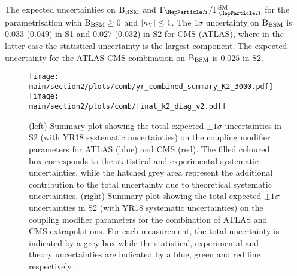The expected uncertainties on $\mathrm{B_{BSM}}$ and $\GammaSM$ for the parametrisation with $\mathrm{B_{BSM}}\geq0$ and $|\kappa_{\mathrm{V}}|\leq1$. The $1\sigma$ uncertainty on $\mathrm{B_{BSM}}$ is $0.033$ ($0.049$) in S1 and $0.027$ ($0.032$) in S2 for CMS (ATLAS), where in the latter case the statistical uncertainty is the largest component.
The expected uncertainty for the ATLAS-CMS combination on  $\mathrm{B_{BSM}}$ is $0.025$ in S2. 

\begin{figure}[hbtp]
\centering
\texttt{[image: \\main/section2/plots/comb/yr\_combined\_summary\_K2\_3000.pdf]}%
\texttt{[image: \\main/section2/plots/comb/final\_k2\_diag\_v2.pdf]}%
\caption{(left) Summary plot showing the total expected $\pm 1\sigma$ uncertainties in S2 (with YR18 systematic uncertainties) on the coupling modifier parameters   for ATLAS (blue)  and CMS (red). The filled coloured box corresponds to the statistical and experimental systematic uncertainties, while the hatched grey area represent the additional contribution to the total uncertainty due to theoretical systematic uncertainties.
(right) Summary plot showing the total expected $\pm 1\sigma$  uncertainties in S2 (with YR18 systematic uncertainties) on the coupling modifier parameters for the combination of ATLAS and CMS extrapolations. For each measurement,  the total uncertainty is indicated by a grey box while the statistical, experimental and theory uncertainties are indicated by a blue, green and red line respectively.}
\label{fig:summary_K2}
\end{figure}


\begin{table}[hbtp]
\centering
\caption{The expected $\pm 1\sigma$ uncertainties, expressed as percentages, on the coupling modifier parameters.%
Values are given for both S1 (with Run~2 systematic uncertainties~\cite{Sirunyan:2018koj}) and S2 (with YR18 systematic uncertainties). The total uncertainty is decomposed into four components: statistical (Stat), signal theory (SigTh), background theory (BkgTh) and experimental (Exp).}
\small
\hspace{0.5cm}

\label{tab:summary_K2}
\vspace{0.5cm}
\end{table}

